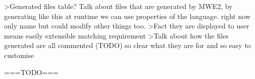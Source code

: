 \documentclass{report}
\begin{document}
>Generated files table? Talk about files that are generated by MWE2, by generating like this at runtime we can use properties of the language. right now only name but could modify other things too.
>Fact they are displayed to user means easily extensible matching requirement \RCustom
>Talk about how the files generated are all commented (TODO) so clear what they are for and so easy to customise \RCustom



===TODO===
\printbibliography
\end{document}
